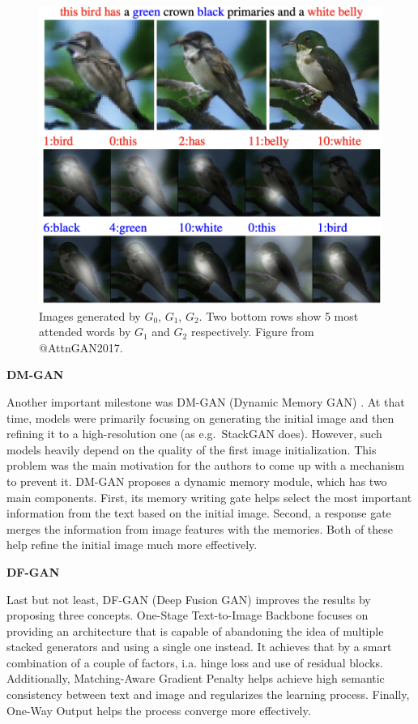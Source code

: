 \documentclass[
]{krantz}
\begin{document}
\begin{figure}

{\centering \includegraphics[width=0.8\linewidth]{figures/02-02-text-2-img/attngan} 

}

\caption{Images generated by $G_{0}$, $G_{1}$, $G_{2}$. Two bottom rows show 5 most attended words by $G_{1}$ and $G_{2}$ respectively. Figure from @AttnGAN2017.}\label{fig:attngan}
\end{figure}

\textbf{DM-GAN}

Another important milestone was DM-GAN (Dynamic Memory GAN) \citep{DMGAN2019}. At that time, models were primarily focusing on generating the initial image and then refining it to a high-resolution one (as e.g.~StackGAN does). However, such models heavily depend on the quality of the first image initialization. This problem was the main motivation for the authors to come up with a mechanism to prevent it. DM-GAN proposes a dynamic memory module, which has two main components. First, its memory writing gate helps select the most important information from the text based on the initial image. Second, a response gate merges the information from image features with the memories. Both of these help refine the initial image much more effectively.

\textbf{DF-GAN}

Last but not least, DF-GAN (Deep Fusion GAN) \citep{DFGAN2020} improves the results by proposing three concepts. One-Stage Text-to-Image Backbone focuses on providing an architecture that is capable of abandoning the idea of multiple stacked generators and using a single one instead. It achieves that by a smart combination of a couple of factors, i.a. hinge loss and use of residual blocks. Additionally, Matching-Aware Gradient Penalty helps achieve high semantic consistency between text and image and regularizes the learning process. Finally, One-Way Output helps the process converge more effectively.
\end{document}

